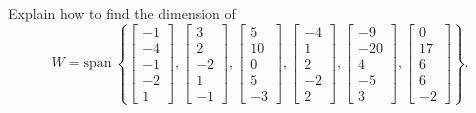 \documentclass{article}
\begin{document}
\begin{exerciseStatement}
    Explain how to find the dimension of
\[W=\mathrm{span}\ \left\{\left[\begin{array}{r}
-1 \\
-4 \\
-1 \\
-2 \\
1
\end{array}\right] , \left[\begin{array}{r}
3 \\
2 \\
-2 \\
1 \\
-1
\end{array}\right] , \left[\begin{array}{r}
5 \\
10 \\
0 \\
5 \\
-3
\end{array}\right] , \left[\begin{array}{r}
-4 \\
1 \\
2 \\
-2 \\
2
\end{array}\right] , \left[\begin{array}{r}
-9 \\
-20 \\
4 \\
-5 \\
3
\end{array}\right] , \left[\begin{array}{r}
0 \\
17 \\
6 \\
6 \\
-2
\end{array}\right]\right\}.\]



  
\end{exerciseStatement}
\end{document}
